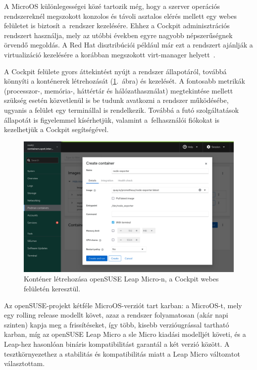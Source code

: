 A MicroOS különlegességei közé tartozik még, hogy a szerver operációs rendszereknél megszokott konzolos és távoli asztalos elérés mellett egy webes felületet is biztosít a~rendszer kezelésére. Ehhez a Cockpit adminisztrációs rendszert használja, mely az utóbbi években egyre nagyobb népszerűségnek örvendő megoldás. A Red Hat disztribúciói például már ezt a rendszert ajánlják a virtualizáció kezelésére a korábban megszokott virt-manager helyett~\cite{RHELDeprecated}.

A Cockpit felülete gyors áttekintést nyújt a rendszer állapotáról, továbbá könnyíti a konténerek létrehozását (\ref{fig:cockpit-container}.~ábra) és kezelését. A fontosabb metrikák (processzor-, memória-, háttértár és hálózathasználat) megtekintése mellett szükség esetén közvetlenül is be tudunk avatkozni a rendszer működésébe, ugyanis a felület egy terminállal is rendelkezik. Továbbá a futó szolgáltatások állapotát is figyelemmel kísérhetjük, valamint a~felhasználói fiókokat is kezelhetjük a Cockpit segítségével.

\begin{figure}[ht]
	\centering
	\includegraphics[width=15cm]{figures/cockpit.png}
	\caption{Konténer létrehozása openSUSE Leap Micro-n, a Cockpit webes felületén keresztül.}
	\label{fig:cockpit-container}
\end{figure}

Az openSUSE-projekt kétféle MicroOS-verziót tart karban: a MicroOS-t, mely egy rolling release modellt követ, azaz a rendszer folyamatosan (akár napi szinten) kapja meg a frissítéseket, így több, kisebb verzióugrással tartható karban, míg az openSUSE Leap Micro a \acrlong{sle} Micro kiadási modelljét követi, és a Leap-hez hasonlóan bináris kompatibilitást garantál a két verzió között. A tesztkörnyezethez a stabilitás és kompatibilitás miatt a Leap Micro változatot választottam.

